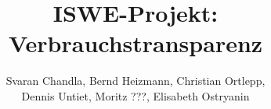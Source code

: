 \documentclass{article}
\begin{document}
\title{ISWE-Projekt: Verbrauchstransparenz}
\author{Svaran Chandla, Bernd Heizmann, Christian Ortlepp,\\ Dennis Untiet, Moritz ???, Elisabeth Ostryanin}
\maketitle   
\tableofcontents
\newpage






\end{document}
